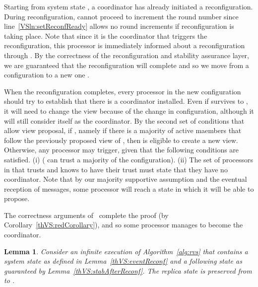\documentclass[11pt]{article}
\newtheorem{lemma}[theorem]{Lemma}
\newenvironment{proof}{\noindent{\bf Proof.}}{\hfill}
\begin{document}
\begin{proof}
Starting from system state , a coordinator  has already initiated a reconfiguration.
During reconfiguration,  cannot proceed to increment the round number since line~\ref{VSln:setReconfReady} allows no round increments if reconfiguration is taking place.
Note that since it is the coordinator that triggers the reconfiguration, this processor is immediately informed about a reconfiguration through .
By the correctness of the reconfiguration and stability assurance layer, we are guaranteed that the reconfiguration will complete and so we move from a configuration  to a new one .

When the reconfiguration completes, every processor in the new configuration  should try to establish that there is a coordinator installed.
Even if  survives to , it will need to change the view because of the change in configuration, although it will still consider itself as the coordinator.
By the second set of conditions that allow view proposal, if    
  , namely if there is a majority of active maembers that follow the previously proposed view of , then  is eligible to create a new view.
Otherwise, any processor  may trigger, given that the following conditions are satisfied. 
(i)  ( can trust a majority of the configuration).
(ii) The set of processors in  that  trusts and  knows to have their trust must state that they have no coordinator.
Note that by our majority supportive assumption and the eventual reception of messages, some processor will reach a state in which it will be able to propose.

The correctness arguments of~\cite{SSVS} complete the proof (by Corollary~\ref{thVS:redCorollary}), and so some processor manages to become the coordinator.
\end{proof}

\begin{lemma}
Consider an infinite execution  of Algorithm~\ref{alg:rvs} that contains a system state  as defined in Lemma~\ref{thVS:eventReconf} and a following state  as guaranteed by Lemma~\ref{thVS:stabAfterReconf}. 
The replica state is preserved from  to .
\end{lemma}
\end{document}
